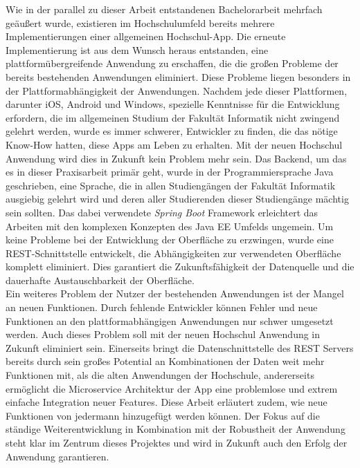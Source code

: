 Wie in der parallel zu dieser Arbeit entstandenen Bachelorarbeit mehrfach geäußert wurde, existieren im Hochschulumfeld bereits mehrere Implementierungen einer allgemeinen Hochschul-\ac{App}. Die erneute Implementierung ist aus dem Wunsch heraus entstanden, eine plattformübergreifende Anwendung zu erschaffen, die die großen Probleme der bereits bestehenden Anwendungen eliminiert. Diese Probleme liegen besonders in der Plattformabhängigkeit der Anwendungen. Nachdem jede dieser Plattformen, darunter iOS, Android und Windows, spezielle Kenntnisse für die Entwicklung erfordern, die im allgemeinen Studium der Fakultät Informatik nicht zwingend gelehrt werden, wurde es immer schwerer, Entwickler zu finden, die das nötige Know-How hatten, diese \acp{App} am Leben zu erhalten. Mit der neuen Hochschul Anwendung wird dies in Zukunft kein Problem mehr sein. Das Backend, um das es in dieser Praxisarbeit primär geht, wurde in der Programmiersprache Java geschrieben, eine Sprache, die in allen Studiengängen der Fakultät Informatik ausgiebig gelehrt wird und deren aller Studierenden dieser Studiengänge mächtig sein sollten. Das dabei verwendete \textit{Spring Boot} Framework erleichtert das Arbeiten mit den komplexen Konzepten des Java \ac{EE} Umfelds ungemein. Um keine Probleme bei der Entwicklung der Oberfläche zu erzwingen, wurde eine \ac{REST}-Schnittstelle entwickelt, die Abhängigkeiten zur verwendeten Oberfläche komplett eliminiert. Dies garantiert die Zukunftsfähigkeit der Datenquelle und die dauerhafte Austauschbarkeit der Oberfläche.\\
\linebreak
Ein weiteres Problem der Nutzer der bestehenden Anwendungen ist der Mangel an neuen Funktionen. Durch fehlende Entwickler können Fehler und neue Funktionen an den plattformabhängigen Anwendungen nur schwer umgesetzt werden. Auch dieses Problem soll mit der neuen Hochschul Anwendung in Zukunft eliminiert sein. Einerseits bringt die Datenschnittstelle des \ac{REST} Servers bereits durch sein großes Potential an Kombinationen der Daten weit mehr Funktionen mit, als die alten Anwendungen der Hochschule, andererseits ermöglicht die Microservice Architektur der \ac{App} eine problemlose und extrem einfache Integration neuer Features. Diese Arbeit erläutert zudem, wie neue Funktionen von jedermann hinzugefügt werden können. Der Fokus auf die ständige Weiterentwicklung in Kombination mit der Robustheit der Anwendung steht klar im Zentrum dieses Projektes und wird in Zukunft auch den Erfolg der Anwendung garantieren.\\
